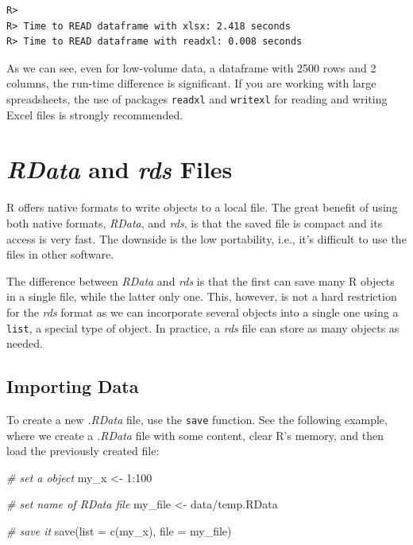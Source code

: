 \documentclass[
  12pt,
]{book}
\newenvironment{Shaded}{\begin{snugshade}}{\end{snugshade}}
\newcommand{\AttributeTok}[1]{\textcolor[rgb]{0.61,0.61,0.61}{#1}}
\newcommand{\CommentTok}[1]{\textcolor[rgb]{0.37,0.37,0.37}{\textit{#1}}}
\newcommand{\DecValTok}[1]{\textcolor[rgb]{0.06,0.06,0.06}{#1}}
\newcommand{\FunctionTok}[1]{\textcolor[rgb]{0,0,0}{#1}}
\newcommand{\NormalTok}[1]{#1}
\newcommand{\OtherTok}[1]{\textcolor[rgb]{0.37,0.37,0.37}{#1}}
\newcommand{\SpecialCharTok}[1]{\textcolor[rgb]{0,0,0}{#1}}
\newcommand{\StringTok}[1]{\textcolor[rgb]{0.5,0.5,0.5}{#1}}
\begin{document}
\begin{verbatim}
R> 
R> Time to READ dataframe with xlsx: 2.418 seconds
R> Time to READ dataframe with readxl: 0.008 seconds
\end{verbatim}

As we can see, even for low-volume data, a dataframe with 2500 rows and 2 columns, the run-time difference is significant. If you are working with large spreadsheets, the use of packages \texttt{readxl} and \texttt{writexl} for reading and writing Excel files is strongly recommended.

\hypertarget{rdata-and-rds-files}{%
\section{\texorpdfstring{\emph{RData} and \emph{rds} Files}{RData and rds Files}}\label{rdata-and-rds-files}}

R offers native formats to write objects to a local file. The great benefit of using both native formats, \emph{RData}, and \emph{rds}, is that the saved file is compact and its access is very fast. The downside is the low portability, i.e., it's difficult to use the files in other software.  

The difference between \emph{RData} and \emph{rds} is that the first can save many R objects in a single file, while the latter only one. This, however, is not a hard restriction for the \emph{rds} format as we can incorporate several objects into a single one using a \texttt{list}, a special type of object. In practice, a \emph{rds} file can store as many objects as needed.

\hypertarget{importing-data-2}{%
\subsection{Importing Data}\label{importing-data-2}}

To create a new \emph{.RData} file, use the \texttt{save} function. See the following example, where we create a \emph{.RData} file with some content, clear R's memory, and then load the previously created file:  

\begin{Shaded}
\begin{Highlighting}[]
\CommentTok{\# set a object}
\NormalTok{my\_x }\OtherTok{\textless{}{-}} \DecValTok{1}\SpecialCharTok{:}\DecValTok{100}

\CommentTok{\# set name of RData file}
\NormalTok{my\_file }\OtherTok{\textless{}{-}} \StringTok{\textquotesingle{}data/temp.RData\textquotesingle{}}

\CommentTok{\# save it}
\FunctionTok{save}\NormalTok{(}\AttributeTok{list =} \FunctionTok{c}\NormalTok{(}\StringTok{\textquotesingle{}my\_x\textquotesingle{}}\NormalTok{), }\AttributeTok{file =}\NormalTok{ my\_file)}
\end{Highlighting}
\end{Shaded}
\end{document}
